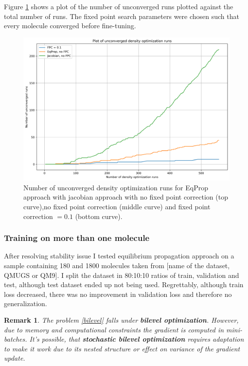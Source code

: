 \documentclass[a4paper,10pt]{report}
\newtheorem{remark}{Remark}
\begin{document}
Figure \ref{fig:stability} shows a plot of the number of unconverged runs plotted against the total number of runs. The fixed point search parameters were chosen such that every molecule converged before fine-tuning.
\begin{figure}[H]
 \centering
 \includegraphics[scale=0.5]{images/stability_plot.png}
 \caption{Number of unconverged density optimization runs for EqProp approach with jacobian approach with no fixed point correction (top curve),no fixed point correction (middle curve) and  fixed point correction $=0.1$ (bottom curve).}
 \label{fig:stability}
\end{figure}



\subsubsection{Training on more than one molecule}
After resolving stability issue I tested equilibrium propagation approach on a sample containing 180 and 1800 molecules taken from [name of the dataset, QMUGS or QM9]. I split the dataset in 80:10:10 ratios of train, validation and test, although test dataset ended up not being used. Regrettably, although train loss decreased, there was no improvement in validation loss and therefore no generalization.

\begin{remark}
 The problem \ref{bilevel} falls under \textbf{bilevel optimization}. However, due to memory and computational constraints the gradient is computed in mini-batches. It's possible, that \textbf{stochastic bilevel optimization} requires adaptation to make it work due to its nested structure or effect on variance of the gradient update.
\end{remark}
\end{document}

